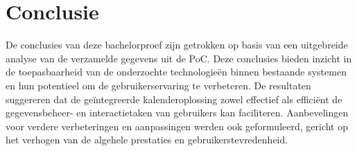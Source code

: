 \section{Conclusie}
De conclusies van deze bachelorproef zijn getrokken op basis van een uitgebreide analyse van de verzamelde gegevens uit de PoC. Deze conclusies bieden inzicht in de toepasbaarheid van de onderzochte technologieën binnen bestaande systemen en hun potentieel om de gebruikerservaring te verbeteren. De resultaten suggereren dat de geïntegreerde kalenderoplossing zowel effectief als efficiënt de gegevensbeheer- en interactietaken van gebruikers kan faciliteren. Aanbevelingen voor verdere verbeteringen en aanpassingen werden ook geformuleerd, gericht op het verhogen van de algehele prestaties en gebruikerstevredenheid.

